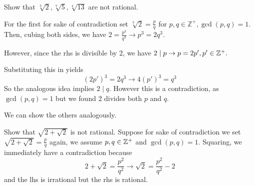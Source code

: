 
\begin{example}[2.2]
Show that $\sqrt[3]{2}, \sqrt[7]{5}, \sqrt[4]{13}$ are not rational.
\par For the first for sake of contradiction set $\sqrt[3]{2} = \frac{p}{q}$ for $p, q \in \mathbb{Z}^{+}, \gcd(p, q)
= 1.$
Then, cubing both sides, we have $2 = \frac{p^3}{q^3} \rightarrow p^3 = 2q^3.$
\par However, since the rhs is divisible by 2, we have $2 \mid p \rightarrow p = 2p', p'
\in \mathbb{Z}^{+}.$
\par Substituting this in yields $$(2p')^3 = 2q^3 \rightarrow 4(p')^3 = q^3$$
So the analogous idea implies $2 \mid q$. However this is a contradiction, as $\gcd(p,
q) = 1$ but we found 2 divides both $p$ and $q$.

\par We can show the others analogously.
\end{example}
\begin{example}[2.3]
Show that $\sqrt{2 + \sqrt2}$ is not rational.
Suppose for sake of contradiction we set $\sqrt{2 + \sqrt{2}} = \frac{p}{q}$ again, we assume $p, q \in \mathbb{Z}^{+}$ and $\gcd(p, q) = 1$.
Squaring, we immediately have a contradiction because $$2 + \sqrt2 = \frac{p^2}{q^2}
\rightarrow \sqrt{2} = \frac{p^2}{q^2} - 2$$
and the lhs is irrational but the rhs is rational.
\end{example}


